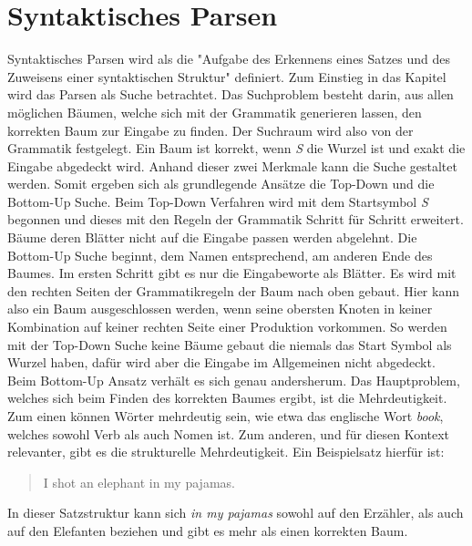 \section{Syntaktisches Parsen}
\label{sec:nlp:syn-parsen}

Syntaktisches Parsen wird als die "Aufgabe des Erkennens eines Satzes und des Zuweisens einer syntaktischen Struktur" definiert. %
Zum Einstieg in das Kapitel wird das Parsen als Suche betrachtet. Das Suchproblem besteht darin, aus allen möglichen Bäumen, welche sich mit der Grammatik generieren lassen, den korrekten Baum zur Eingabe zu finden. Der Suchraum wird also von der Grammatik festgelegt. Ein Baum ist korrekt, wenn \textit{S} die Wurzel ist und exakt die Eingabe abgedeckt wird. Anhand dieser zwei Merkmale kann die Suche gestaltet werden. Somit ergeben sich als grundlegende Ansätze die Top-Down und die Bottom-Up Suche. Beim Top-Down Verfahren wird mit dem Startsymbol \textit{S} begonnen und dieses mit den Regeln der Grammatik Schritt für Schritt erweitert. Bäume deren Blätter nicht auf die Eingabe passen werden abgelehnt. Die Bottom-Up Suche beginnt, dem Namen entsprechend, am anderen Ende des Baumes. Im ersten Schritt gibt es nur die Eingabeworte als Blätter. Es wird mit den rechten Seiten der Grammatikregeln der Baum nach oben gebaut. Hier kann also ein Baum ausgeschlossen werden, wenn seine obersten Knoten in keiner Kombination auf keiner rechten Seite einer Produktion vorkommen. %
So werden mit der Top-Down Suche keine Bäume gebaut die niemals das Start Symbol als Wurzel haben, dafür wird aber die Eingabe im Allgemeinen nicht abgedeckt. Beim Bottom-Up Ansatz verhält es sich genau andersherum. 
Das Hauptproblem, welches sich beim Finden des korrekten Baumes ergibt, ist die Mehrdeutigkeit. Zum einen können Wörter mehrdeutig sein, wie etwa das englische Wort \textit{book}, welches sowohl Verb als auch Nomen ist. Zum anderen, und für diesen Kontext relevanter, gibt es die strukturelle Mehrdeutigkeit. Ein Beispielsatz hierfür ist: 
\begin{quote}
I shot an elephant in my pajamas.
\end{quote}
In dieser Satzstruktur kann sich \textit{in my pajamas} sowohl auf den Erzähler, als auch auf den Elefanten beziehen und gibt es mehr als einen korrekten Baum. %
